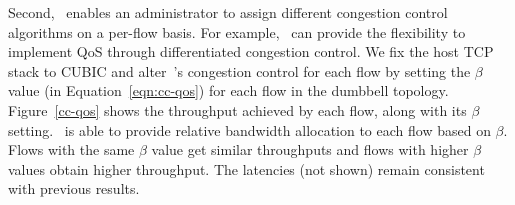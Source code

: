 Second,~\acdc{} enables an administrator to assign different 
congestion control algorithms on a per-flow basis. 
For example,~\acdc{} can provide the flexibility to implement QoS through differentiated congestion control. 
We fix the host TCP stack to CUBIC and alter~\acdc{}'s congestion control for each flow
by setting the $\beta$ value (in Equation~\ref{eqn:cc-qos}) for each flow in the dumbbell topology. 
Figure~\ref{cc-qos} shows the throughput achieved by each flow, 
along with its $\beta$ setting.~\acdc{} is 
able to provide relative bandwidth allocation to each flow based on $\beta$. 
Flows with the same $\beta$ value get similar throughputs and flows with higher $\beta$ values 
obtain higher throughput.
The latencies (not shown) remain consistent with
previous results.



